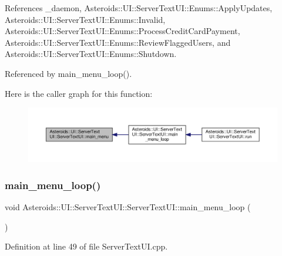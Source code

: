 References \+\_\+daemon, Asteroids\+::\+U\+I\+::\+Server\+Text\+U\+I\+::\+Enums\+::\+Apply\+Updates, Asteroids\+::\+U\+I\+::\+Server\+Text\+U\+I\+::\+Enums\+::\+Invalid, Asteroids\+::\+U\+I\+::\+Server\+Text\+U\+I\+::\+Enums\+::\+Process\+Credit\+Card\+Payment, Asteroids\+::\+U\+I\+::\+Server\+Text\+U\+I\+::\+Enums\+::\+Review\+Flagged\+Users, and Asteroids\+::\+U\+I\+::\+Server\+Text\+U\+I\+::\+Enums\+::\+Shutdown.



Referenced by main\+\_\+menu\+\_\+loop().

Here is the caller graph for this function\+:\nopagebreak
\begin{figure}[H]
\begin{center}
\leavevmode
\includegraphics[width=350pt]{classAsteroids_1_1UI_1_1ServerTextUI_1_1ServerTextUI_afc4ba344c4244c2650ade2148e08d5f2_icgraph}
\end{center}
\end{figure}
\mbox{\label{classAsteroids_1_1UI_1_1ServerTextUI_1_1ServerTextUI_aae7cc1a6a551fc4dbd5ac7270f1d3e94}} 
\subsubsection{\texorpdfstring{main\+\_\+menu\+\_\+loop()}{main\_menu\_loop()}}
{\footnotesize\ttfamily void Asteroids\+::\+U\+I\+::\+Server\+Text\+U\+I\+::\+Server\+Text\+U\+I\+::main\+\_\+menu\+\_\+loop (\begin{DoxyParamCaption}{ }\end{DoxyParamCaption})\hspace{0.3cm}{\ttfamily [private]}}



Definition at line 49 of file Server\+Text\+U\+I.\+cpp.



